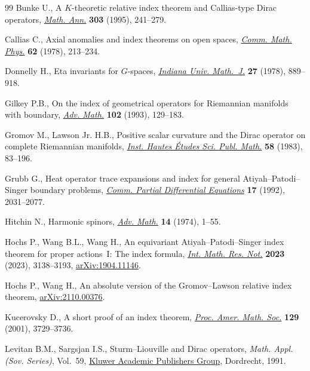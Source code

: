 \documentclass[10pt,a4paper]{amsart}
\numberwithin{equation}{section}
\begin{document}
\begin{thebibliography}{99}
Bunke U., A {$K$}-theoretic relative index theorem and {C}allias-type {D}irac
 operators, \href{https://doi.org/10.1007/BF01460989}{\textit{Math. Ann.}} \textbf{303} (1995), 241--279.

Callias C., Axial anomalies and index theorems on open spaces, \href{https://doi.org/10.1007/BF01202525}{\textit{Comm.
 Math. Phys.}} \textbf{62} (1978), 213--234.

Donnelly H., Eta invariants for {$G$}-spaces, \href{https://doi.org/10.1512/iumj.1978.27.27060}{\textit{Indiana Univ. Math.~J.}}
 \textbf{27} (1978), 889--918.

Gilkey P.B., On the index of geometrical operators for {R}iemannian manifolds
 with boundary, \href{https://doi.org/10.1006/aima.1993.1063}{\textit{Adv. Math.}} \textbf{102} (1993), 129--183.

Gromov M., Lawson Jr. H.B., Positive scalar curvature and the {D}irac operator
 on complete {R}iemannian manifolds, \href{https://doi.org/10.1007/BF02953774}{\textit{Inst. Hautes \'Etudes Sci. Publ.
 Math.}} \textbf{58} (1983), 83--196.

Grubb G., Heat operator trace expansions and index for general
 {A}tiyah--{P}atodi--{S}inger boundary problems, \href{https://doi.org/10.1080/03605309208820913}{\textit{Comm. Partial
 Differential Equations}} \textbf{17} (1992), 2031--2077.

Hitchin N., Harmonic spinors, \href{https://doi.org/10.1016/0001-8708(74)90021-8}{\textit{Adv. Math.}} \textbf{14} (1974), 1--55.

Hochs P., Wang B.L., Wang H., An equivariant {A}tiyah--{P}atodi--{S}inger index
 theorem for proper actions~{I}: {T}he index formula, \href{https://doi.org/10.1093/imrn/rnab324}{\textit{Int. Math. Res.
 Not.}} \textbf{2023} (2023), 3138--3193, \href{https://arxiv.org/abs/1904.11146}{arXiv:1904.11146}.

Hochs P., Wang H., An absolute version of the {G}romov--{L}awson relative index
 theorem, \href{https://arxiv.org/abs/2110.00376}{arXiv:2110.00376}.

Kucerovsky D., A short proof of an index theorem, \href{https://doi.org/10.1090/S0002-9939-01-06164-0}{\textit{Proc. Amer. Math.
 Soc.}} \textbf{129} (2001), 3729--3736.

Levitan B.M., Sargsjan I.S., Sturm--{L}iouville and {D}irac operators,
 \textit{Math. Appl. (Sov. Series)}, Vol.~59, \href{https://doi.org/10.1007/978-94-011-3748-5}{Kluwer Academic Publishers
 Group}, Dordrecht, 1991.


\end{thebibliography}
\end{document}
